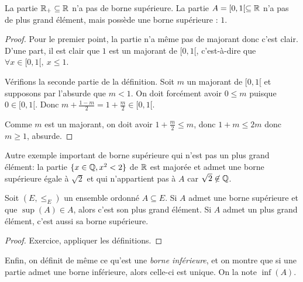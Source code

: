 \begin{exemple}
La partie $\mathbb{R}_+ \subseteq \mathbb{R}$ n'a pas de borne supérieure. 
La partie $A=[0,1[ \subseteq \mathbb{R}$ n'a pas de plus grand élément, mais possède une borne supérieure : $1$.
\end{exemple}
\begin{proof} Pour le premier point, la partie n'a même pas de majorant donc c'est clair. 
D'une part, il est clair que $1$ est un majorant de $[0,1[$, c'est-à-dire que $\forall x\in [0,1[, \: x\leq 1$.

Vérifions la seconde partie de la définition.  Soit $m$ un majorant de $[0,1[$ et supposons par l'absurde que $m < 1$. On doit forcément avoir $0\leq m$ puisque $0\in [0,1[$. Donc $m+\frac{1-m}{2}=1+\frac{m}{2} \in [0,1[$.
\begin{center}
\end{center}

 Comme $m$ est un majorant, on doit avoir $1+\frac{m}{2}\leq m$, donc $1+m\leq 2m$ donc $m\geq 1$, absurde.
\end{proof}

Autre exemple important de borne supérieure qui n'est pas un plus grand élément: la partie $\{x\in \mathbb{Q}, x^2<2\}$ de $\mathbb{R}$ est majorée et admet une borne supérieure égale à $\sqrt 2$ et qui n'appartient pas à $A$ car $\sqrt2\not\in \mathbb{Q}$. 

\begin{proposition}
Soit $(E,\leq_E)$ un ensemble ordonné $A\subseteq E$.
Si $A$ admet une borne supérieure et que $\sup(A) \in A$, alors c'est son plus grand élément.
Si $A$ admet un plus grand élément, c'est aussi sa borne supérieure.
\end{proposition}
\begin{proof}
Exercice, appliquer les définitions.
\end{proof}

Enfin, on définit de même ce qu'est une \emph{borne inférieure}, et on montre que si une partie admet une borne inférieure, alors celle-ci est unique. On la note $\inf(A)$. 

